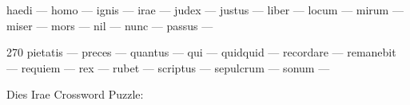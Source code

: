\documentclass[12pt]{article}
\begin{document}
\pagestyle{fancy}
\fancyhf{}
\renewcommand{\headrulewidth}{0pt}
\renewcommand{\footrulewidth}{0pt}

\libertine
\renewcommand\PuzzleClueFont{\rm\normalsize}
\noindent\begin{rotate}{0}
\small
 haedi --- homo --- ignis --- irae --- judex --- justus --- liber --- locum --- mirum --- miser --- mors --- nil --- nunc --- passus --- 
\end{rotate}
\hfill
\begin{rotate}{270}
\small
pietatis --- preces --- quantus --- qui --- quidquid --- recordare --- remanebit --- requiem --- rex --- rubet --- scriptus --- sepulcrum --- sonum ---
\end{rotate}

\begin{center}
  \huge{Dies Irae Crossword Puzzle:}
\end{center}
\vspace{1.5cm}
\end{document}
